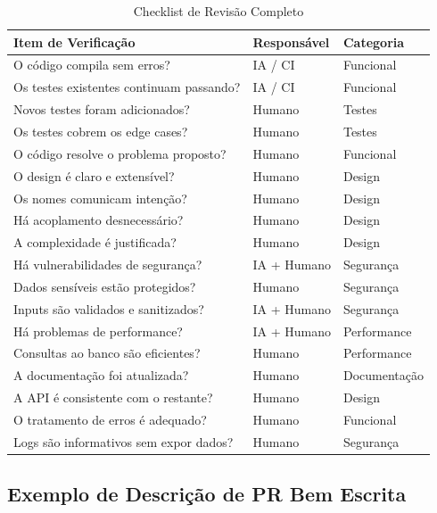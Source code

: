 \begin{table}[htbp]
\centering
\caption{Checklist de Revisão Completo}
\begin{tabular}{p{6cm}p{2.5cm}p{3.5cm}}
\toprule
\textbf{Item de Verificação} & \textbf{Responsável} & \textbf{Categoria} \\
\midrule
O código compila sem erros?                    & IA / CI    & Funcional \\
Os testes existentes continuam passando?       & IA / CI    & Funcional \\
Novos testes foram adicionados?                & Humano     & Testes \\
Os testes cobrem os edge cases?                & Humano     & Testes \\
O código resolve o problema proposto?          & Humano     & Funcional \\
O design é claro e extensível?                 & Humano     & Design \\
Os nomes comunicam intenção?                   & Humano     & Design \\
Há acoplamento desnecessário?                  & Humano     & Design \\
A complexidade é justificada?                  & Humano     & Design \\
Há vulnerabilidades de segurança?              & IA + Humano & Segurança \\
Dados sensíveis estão protegidos?              & Humano     & Segurança \\
Inputs são validados e sanitizados?            & IA + Humano & Segurança \\
Há problemas de performance?                   & IA + Humano & Performance \\
Consultas ao banco são eficientes?             & Humano     & Performance \\
A documentação foi atualizada?                 & Humano     & Documentação \\
A API é consistente com o restante?            & Humano     & Design \\
O tratamento de erros é adequado?              & Humano     & Funcional \\
Logs são informativos sem expor dados?         & Humano     & Segurança \\
\bottomrule
\end{tabular}
\end{table}

\subsection{Exemplo de Descrição de PR Bem Escrita}

